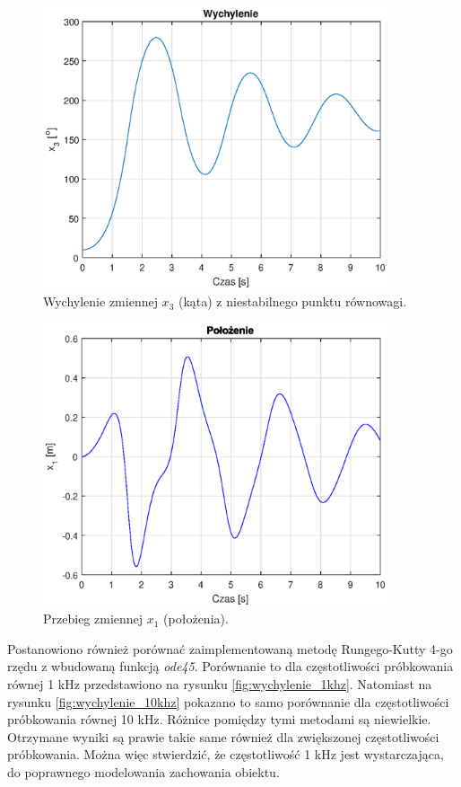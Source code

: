 \begin{figure}[h]
	\centering
	\includegraphics[width=4in]{Figures/wychylenie_test.eps}
	\caption{Wychylenie zmiennej \(x_3\) (kąta) z niestabilnego punktu równowagi.}
	\label{fig:wychylenie_test}
\end{figure}

\begin{figure}[H]
	\centering
	\includegraphics[width=4in]{Figures/polozenie_test.eps}
	\caption{Przebieg zmiennej \(x_1\) (położenia).}
	\label{fig:polozenie_test}
\end{figure}

Postanowiono również porównać zaimplementowaną metodę Rungego-Kutty 4-go rzędu z wbudowaną funkcją \textit{ode45}. Porównanie to dla częstotliwości próbkowania równej 1 kHz przedstawiono na rysunku \ref{fig:wychylenie_1khz}. Natomiast na rysunku \ref{fig:wychylenie_10khz} pokazano to samo porównanie dla częstotliwości próbkowania równej 10 kHz. Różnice pomiędzy tymi metodami są niewielkie. Otrzymane wyniki są prawie takie same również dla zwiększonej częstotliwości próbkowania. Można więc stwierdzić, że częstotliwość 1 kHz jest wystarczająca, do poprawnego modelowania zachowania obiektu.

